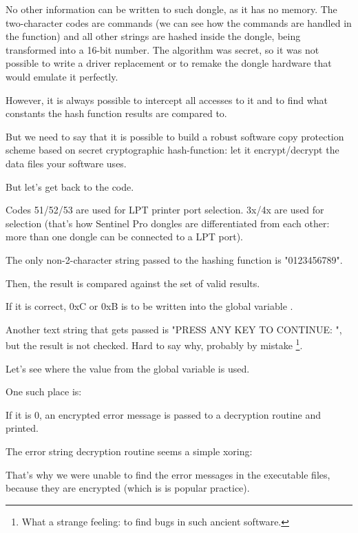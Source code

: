 No other information can be written to such dongle, as it has no memory.
The two-character codes are commands
(we can see how the commands are handled in the 
 function) 
and all other strings are hashed inside the dongle, being transformed into a 16-bit number.
The algorithm was secret,
so it was not possible to write a driver replacement or to remake the dongle hardware that would emulate it perfectly.

However, it is always possible to intercept all accesses to it and to find what constants
the hash function results are compared to.

But we need to say that it is possible to build a robust software copy protection scheme based on secret
cryptographic hash-function: let it encrypt/decrypt the data files your software uses.

But let's get back to the code.

Codes 51/52/53 
are used for LPT printer port selection.
3x/4x are used for  
selection (that's how Sentinel Pro dongles are differentiated from each other: more than one
dongle can be connected to a LPT port).

The only non-2-character string passed to the hashing function is "0123456789".

Then, the result is compared against the set of valid results.

If it is correct, 0xC or 0xB is to be written into the global variable .%

Another text string that gets passed is
"PRESS ANY KEY TO CONTINUE: ", but the result is not checked.
Hard to say why, probably by mistake
\footnote{What a strange feeling: to find bugs in such ancient software.}.

Let's see where the value from the global variable  is used.

One such place is:



If it is 0, an encrypted error message is passed to a decryption routine and printed.


The error string decryption routine seems a simple \gls{xoring}:



That's why we were unable to find the error messages in the executable files, because they are encrypted
(which is is popular practice).

